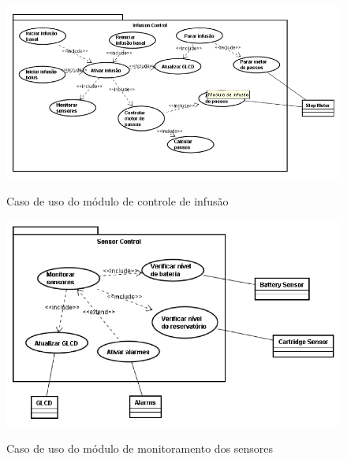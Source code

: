 \begin{figure}[htp]
	\centering
	\includegraphics[scale=0.7]{images/modulo_infusao.png}
	\caption{Caso de uso do módulo de controle de infusão}	
	\label{fig:usecasemoduloinfusao}
	\cite{galvao2013requirements}
\end{figure}

\begin{figure}[htp]
	\centering
	\includegraphics[scale=0.7]{images/modulo_sensores.png}
	\caption{Caso de uso do módulo de monitoramento dos sensores}	
	\label{fig:usecasemodulosensores}
	\cite{galvao2013requirements}
\end{figure}


